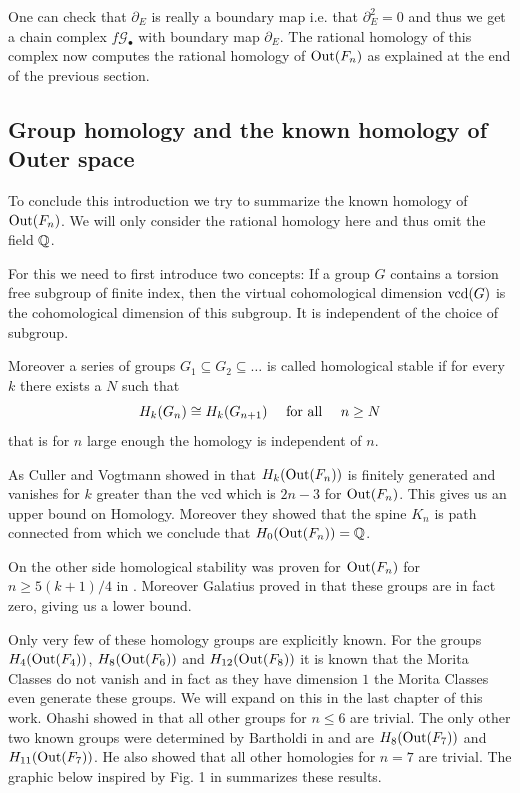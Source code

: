 One can check that $\partial_{E}$ is really a boundary map i.e. that $\partial_{E}^2 = 0$ and thus
we get a chain complex $f\mathcal{G}_{\bullet}$ with boundary map $\partial_{E}$.
The rational homology of this complex now computes the rational homology of $\operatorname{Out}(F_{n})$ as
explained at the end of the previous section.


\subsection{Group homology and the known homology of Outer space}
To conclude this introduction we try to summarize the known homology of $\operatorname{Out}(F_{n})$.
We will only consider the rational homology here and thus omit the field $\mathbb{Q}$.

For this we need to first introduce two concepts:
If a group $G$ contains a torsion free subgroup of finite index, then the virtual cohomological dimension $\operatorname{vcd}(G)$
is the cohomological dimension of this subgroup. It is independent of the choice of subgroup.

Moreover a series of groups $G_1 \subseteq G_2 \subseteq \ldots$ is called homological stable if for every $k$ 
there exists a $N$ such that 
\[
	H_{k}(G_{n}) \cong H_{k}(G_{n+1}) \qq{ for all } n \geq N
\]
that is for $n$ large enough the homology is independent of  $n$.

As Culler and Vogtmann showed in \cite{vogtmann86} that $H_{k}(\operatorname{Out}(F_{n}))$ is finitely generated and vanishes for $k$ greater
than the vcd which is $2n -3$ for $\operatorname{Out}(F_{n})$. This gives us an upper bound on Homology.
Moreover they showed that the spine $K_{n}$ is path connected from which we conclude that $H_0(\operatorname{Out}(F_{n})) = \mathbb{Q}$.

On the other side homological stability was proven for $\operatorname{Out}(F_{n})$ for $n \geq 5 (k+1) / 4$ in \cite{hatcher98,hatcher04}.
Moreover Galatius proved in \cite{galatius11} that these groups are in fact zero, giving us a lower bound.

Only very few of these homology groups are explicitly known.
For the groups $H_{4}(\operatorname{Out}(F_{4}))$, $H_{8}(\operatorname{Out}(F_{6}))$ and $H_{12}(\operatorname{Out}(F_{8}))$ it is known 
that the Morita Classes do not vanish and in fact as they have dimension $1$ the Morita Classes even generate these groups.
We will expand on this in the last chapter of this work.
Ohashi showed in \cite{ohashi08} that all other groups for $n \leq 6$ are trivial. 
The only other two known groups were determined by Bartholdi in \cite{bartholdi16} and are
$H_{8}(\operatorname{Out}(F_{7}))$ and $H_{11}(\operatorname{Out}(F_{7}))$. He also showed that all other homologies for $n = 7$ are trivial.
The graphic below inspired by Fig. 1 in \cite{conant16} summarizes these results.

